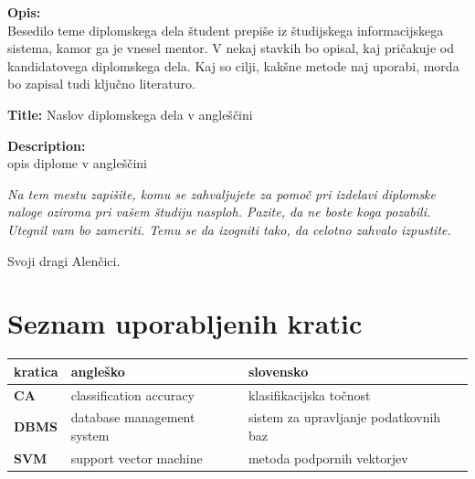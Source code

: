 \documentclass[a4paper,12pt,openright]{book}
\newcommand{\clearemptydoublepage}{\newpage{\pagestyle{empty}\cleardoublepage}}
\begin{document}
\bigskip
\noindent\textbf{Opis:}\\
Besedilo teme diplomskega dela študent prepiše iz študijskega informacijskega sistema, kamor ga je vnesel mentor. 
V nekaj stavkih bo opisal, kaj pričakuje od kandidatovega diplomskega dela. 
Kaj so cilji, kakšne metode naj uporabi, morda bo zapisal tudi ključno literaturo.

\bigskip
\noindent\textbf{Title:} Naslov diplomskega dela v angleščini

\bigskip
\noindent\textbf{Description:}\\
opis diplome v angleščini

\vfill



\vspace{2cm}

\clearemptydoublepage

\thispagestyle{empty}\mbox{}\vfill\null\it%
\noindent
Na tem mestu zapišite, komu se zahvaljujete za pomoč pri izdelavi diplomske naloge oziroma pri vašem študiju nasploh. Pazite, da ne boste koga pozabili. Utegnil vam bo zameriti. Temu se da izogniti tako, da celotno zahvalo izpustite.
\rm\normalfont

\clearemptydoublepage

\thispagestyle{empty}\mbox{}{\textheight}\mbox{}\hfill\begin{minipage}{0.55\textwidth}%
Svoji dragi Alenčici.
\normalfont\end{minipage}

\clearemptydoublepage


\pagestyle{empty}
\def\thepage{}%
\tableofcontents{}


\clearemptydoublepage


\chapter*{Seznam uporabljenih kratic}

\noindent\begin{tabular}{p{}|p{}|p{}}    %
  {\bf kratica} & {\bf angleško}                              & {\bf slovensko} \\ \hline
  {\bf CA}      & classification accuracy               & klasifikacijska točnost \\
  {\bf DBMS} & database management system & sistem za upravljanje podatkovnih baz \\
  {\bf SVM}   & support vector machine              & metoda podpornih vektorjev \\
\end{tabular}
\end{document}
